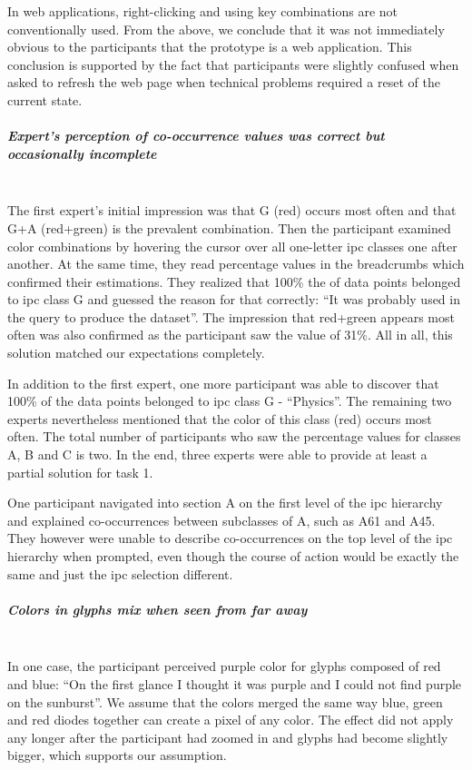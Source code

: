 In web applications, right-clicking and using key combinations are not conventionally used.
From the above, we conclude that it was not immediately obvious to the participants that the prototype is a web application.
This conclusion is supported by the fact that participants were slightly confused when asked to refresh the web page when technical problems required a reset of the current state.

\subparagraph{Expert's perception of co-occurrence values was correct but occasionally incomplete}~\\
The first expert's initial impression was that G (red) occurs most often and that G+A (red+green) is the prevalent combination.
Then the participant examined color combinations by hovering the cursor over all one-letter \gls{ipc} classes one after another.
At the same time, they read percentage values in the breadcrumbs which confirmed their estimations.
They realized that 100\% the of data points belonged to \gls{ipc} class G  and guessed the reason for that correctly: ``It was probably used in the query to produce the dataset''.
The impression that red+green appears most often was also confirmed as the participant saw the value of 31\%.
All in all, this solution matched our expectations completely.

In addition to the first expert, one more participant was able to discover that 100\% of the data points belonged to \gls{ipc} class G - ``Physics''.
The remaining two experts nevertheless mentioned that the color of this class (red) occurs most often.
The total number of participants who saw the percentage values for classes A, B and C is two.
In the end, three experts were able to provide at least a partial solution for task 1.

One participant navigated into section A on the first level of the \gls{ipc} hierarchy and explained co-occurrences between subclasses of A, such as A61 and A45.
They however were unable to describe co-occurrences on the top level of the \gls{ipc} hierarchy when prompted, even though the course of action would be exactly the same and just the \gls{ipc} selection different.

\subparagraph{Colors in glyphs mix when seen from far away}~\\
In one case, the participant perceived purple color for glyphs composed of red and blue: ``On the first glance I thought it was purple and I could not find purple on the sunburst''.
We assume that the colors merged the same way blue, green and red diodes together can create a pixel of any color.
The effect did not apply any longer after the participant had zoomed in and glyphs had become slightly bigger, which supports our assumption.

